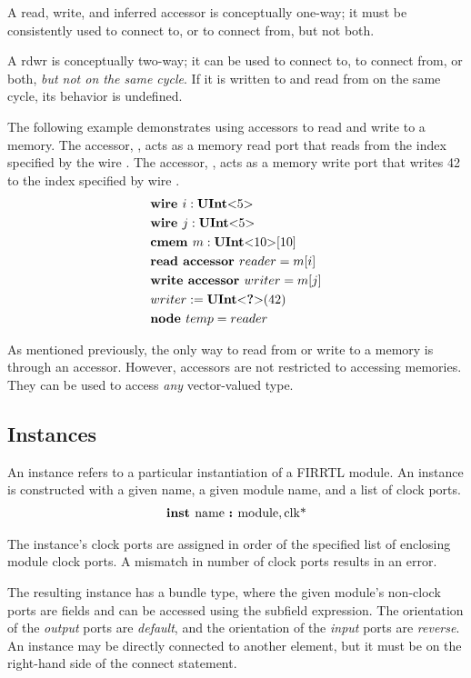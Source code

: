 \documentclass[12pt]{article}
\begin{document}
A read, write, and inferred accessor is conceptually one-way; it must be consistently used to connect to, or to connect from, but not both.

A rdwr is conceptually two-way; it can be used to connect to, to connect from, or both, {\em but not on the same cycle}.
If it is written to and read from on the same cycle, its behavior is undefined.

The following example demonstrates using accessors to read and write to a memory.
The accessor, , acts as a memory read port that reads from the index specified by the wire .
The accessor, , acts as a memory write port that writes 42 to the index specified by wire .
\[
\begin{aligned}
&\text{\bf wire\ } i : \text{\bf UInt}\text{\bf $<$} 5 \text{\bf $>$} \\
&\text{\bf wire\ } j : \text{\bf UInt}\text{\bf $<$} 5 \text{\bf $>$} \\
&\text{\bf cmem\ } m : \text{\bf UInt}\text{\bf $<$} 10 \text{\bf $>$}[10] \\
&\text{\bf read\ } \text{\bf accessor\ } reader = m[i] \\
&\text{\bf write\ } \text{\bf accessor\ } writer = m[j] \\
&writer := \text{\bf UInt}\text{\bf $<$} \text{\bf ?} \text{\bf $>$}(42) \\
&\text{\bf node\ } temp = reader \\
\end{aligned}
\]

As mentioned previously, the only way to read from or write to a memory is through an accessor.
However, accessors are not restricted to accessing memories.
They can be used to access {\em any} vector-valued type. 

\subsection{Instances}
An instance refers to a particular instantiation of a FIRRTL module.
An instance is constructed with a given name, a given module name, and a list of clock ports.
\[
\begin{aligned}
\text{\bf inst\ } \text{name } \text{\bf :\ } \text{module}, \text{clk*}
\end{aligned}
\]

The instance's clock ports are assigned in order of the specified list of enclosing module clock ports.
A mismatch in number of clock ports results in an error.

The resulting instance has a bundle type, where the given module's non-clock ports are fields and can be accessed using the subfield expression.
The orientation of the {\em output} ports are {\em default}, and the orientation of the {\em input} ports are {\em reverse}.
An instance may be directly connected to another element, but it must be on the right-hand side of the connect statement.
\end{document}
